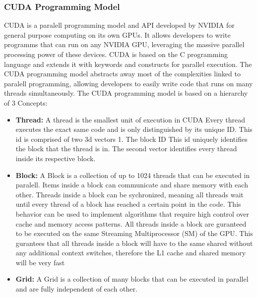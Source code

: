 \subsubsection{CUDA Programming Model}
CUDA is a paralell programming model and API developed by NVIDIA for general purpose computing on its own GPUs.
It allows developers to write programms that can run  on any NVIDIA GPU, leveraging the massive parallel processing power of these devices.
CUDA is based on the C programming language and extends it with keywords and constructs for parallel execution.
The CUDA programming model abstracts away most of the complexities linked to paralell
programming, allowing developers to easily write code that runs on many threads simultaneously.
The CUDA programming model is based on a hierarchy of 3 Concepts:
\begin{itemize}
    \item \textbf{Thread:} A thread is the smallest unit of execution in CUDA
          Every thread executes the exact same code and is only distinguished by its unique
          ID. This id is comprised of two 3d vectors 1. The block ID This id uniquely identifies the block that the thread is in. The second vector identifies every thread inside its respective block.
    \item \textbf{Block:} A Block is a collection of up to 1024 threads that can be executed in paralell. Items inside a block can communicate and share memory with each other. Threads inside a block can be sychronized, meaning all threads wait until every thread of a block has reached a certain point in the code.
          This behavior can be used to implement algorithms that require  high control over cache and memory access patterns.
          All threads inside a block are guranteed to be executed on the same Streaming Multiprocessor (SM) of the GPU.
          This gurantees that all threads inside a block will have to the same shared
          without any additional context switches, therefore the L1 cache and shared
          memory will be very fast
    \item \textbf{Grid:} A Grid is a collection of many blocks that can be executed in parallel and are fully independent of each other.
\end{itemize}

